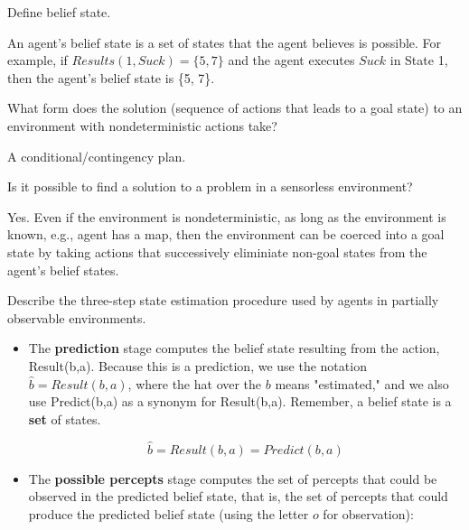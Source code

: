 \begin{questions}

\question Define belief state.

\begin{solution}[.5in]
An agent's belief state is a set of states that the agent believes is possible.  For example, if $Results(1,Suck) = \{5, 7\}$ and the agent executes $Suck$ in State 1, then the agent's belief state is \{5, 7\}.

\end{solution}

\question What form does the solution (sequence of actions that leads to a goal state) to an environment with nondeterministic actions take?

\begin{solution}[.5in]
A conditional/contingency plan.
\end{solution}

\question Is it possible to find a solution to a problem in a sensorless environment?

\begin{solution}[1in]
Yes.  Even if the environment is nondeterministic, as long as the environment is known, e.g., agent has a map, then the environment can be coerced into a goal state by taking actions that successively eliminiate non-goal states from the agent's belief states.
\end{solution}

\question Describe the three-step state estimation procedure used by agents in partially observable environments.

\begin{solution}[3in]
\begin{itemize}
\item The {\bf prediction} stage computes the belief state resulting from the action, Result(b,a).  Because this is a prediction, we use the notation $\hat{b} = Result(b,a)$, where the hat over the $b$ means "estimated," and we also use Predict(b,a) as a synonym for Result(b,a).  Remember, a belief state is a {\bf set} of states.

\vspace{-.1in}

\[
\hat{b} = Result(b,a) = Predict(b, a)
\]

\item The {\bf possible percepts }stage computes the set of percepts that could be observed in the predicted belief state, that is, the set of percepts that could produce the predicted belief state (using the letter $o$ for observation):


\end{itemize}
\end{solution}
\end{questions}
